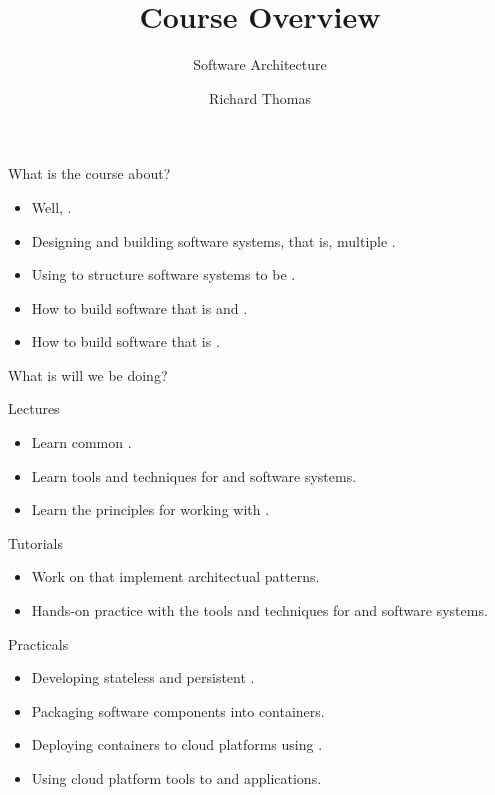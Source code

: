 \documentclass{slide}
\title{Course Overview}
\subtitle{Software Architecture}
\institute{University of Queensland}
\author{Richard Thomas}
\date{\week{1}}
\begin{document}
\maketitle

\begin{frame}{What is the course about?}
\begin{itemize}[<+->]
    \item Well, .
    \item Designing and building software systems, that is, multiple .
    \item Using  to structure software systems to be .
    \item How to build software that is  and .
    \item How to build software that is .
\end{itemize}
\end{frame}


\begin{frame}{What is will we be doing?}

{\color{pine} Lectures}
\begin{itemize}[<+->]
    \item Learn common .
    \item Learn tools and techniques for  and  software systems.
    \item Learn the principles for working with .
\end{itemize}

{\color{pine} Tutorials}
\begin{itemize}[<+->]
    \item Work on  that implement architectual patterns.
    \item Hands-on practice with the tools and techniques for  and  software systems.
\end{itemize}

{\color{pine} Practicals}
\begin{itemize}[<+->]
    \item Developing stateless and persistent .
    \item Packaging software components into  containers.
    \item Deploying containers to cloud platforms using .
    \item Using cloud platform tools to  and  applications.
\end{itemize}

\end{frame}
\end{document}
